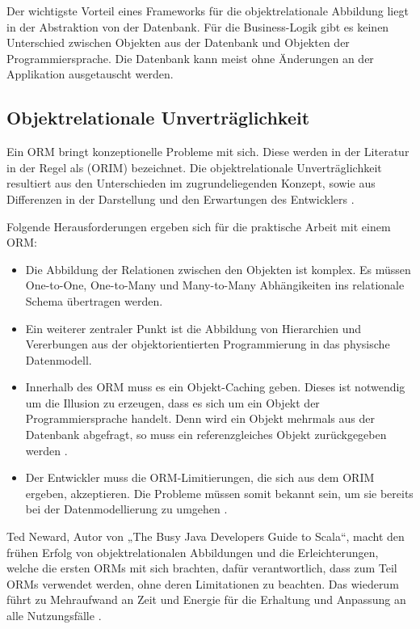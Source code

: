 Der wichtigste Vorteil eines Frameworks für die objektrelationale Abbildung liegt in der Abstraktion von der Datenbank. Für die Business-Logik gibt es keinen Unterschied zwischen Objekten aus der Datenbank und Objekten der Programmiersprache. Die Datenbank kann meist ohne Änderungen an der Applikation ausgetauscht werden.

\FloatBarrier
\subsection{Objektrelationale Unverträglichkeit}

Ein ORM bringt konzeptionelle Probleme mit sich. Diese werden in der Literatur in der Regel als  (ORIM) bezeichnet. Die objektrelationale Unverträglichkeit resultiert aus den Unterschieden im zugrundeliegenden Konzept, sowie aus Differenzen in der Darstellung und den Erwartungen des Entwicklers \cite{bowers}.

Folgende Herausforderungen ergeben sich für die praktische Arbeit mit einem ORM:

\begin{itemize}
  \item Die Abbildung der Relationen zwischen den Objekten ist komplex. Es müssen One-to-One, One-to-Many und Many-to-Many Abhängikeiten ins relationale Schema übertragen werden.
\item Ein weiterer zentraler Punkt ist die Abbildung von Hierarchien und Vererbungen aus der objektorientierten Programmierung in das physische Datenmodell. 
\item Innerhalb des ORM muss es ein Objekt-Caching geben. Dieses ist notwendig um die Illusion zu erzeugen, dass es sich um ein Objekt der Programmiersprache handelt. Denn wird ein Objekt mehrmals aus der Datenbank abgefragt, so muss ein referenzgleiches Objekt zurückgegeben werden \cite{inappropriate-abstractions}.
\item Der Entwickler muss die ORM-Limitierungen, die sich aus dem ORIM ergeben, akzeptieren. Die Probleme müssen somit bekannt sein, um sie bereits bei der Datenmodellierung zu umgehen \cite{vietnam}. 
\end{itemize}

Ted Neward, Autor von „The Busy Java Developers Guide to Scala“, macht den frühen Erfolg von objektrelationalen Abbildungen und die Erleichterungen, welche die ersten ORMs mit sich brachten, dafür verantwortlich, dass zum Teil ORMs verwendet werden, ohne deren Limitationen zu beachten. Das wiederum führt zu Mehraufwand an Zeit und Energie für die Erhaltung und Anpassung an alle Nutzungsfälle \cite{vietnam}.

